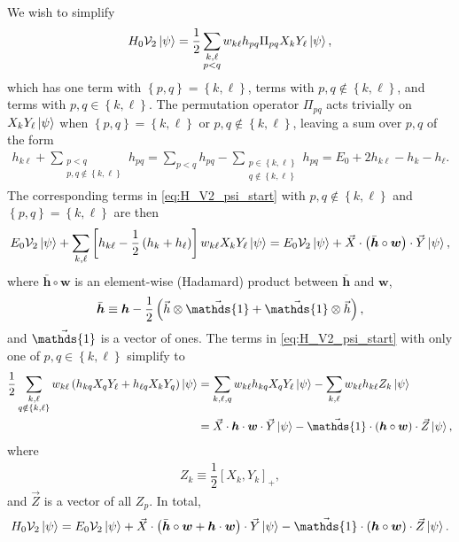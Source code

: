 \documentclass[nofootinbib,notitlepage,11pt]{revtex4-2}
\newcommand{\f}[2]{\dfrac{#1}{#2}} %
\newcommand{\p}[1]{\left(#1\right)} %
\renewcommand{\sp}[1]{\left[#1\right]} %
\renewcommand{\set}[1]{\left\{#1\right\}} %
\renewcommand{\c}{\cdot} %
\renewcommand{\oc}{\circ} %
\newcommand{\m}{\bm} %
\renewcommand{\v}{\vec} %
\newcommand{\1}{\mathds{1}}
\newcommand{\V}{\mathcal{V}}
\begin{document}
We wish to simplify
\begin{align}
  H_0 \V_2 \ket\psi
  = \f12 \sum_{\substack{k,\ell\\p<q}} w_{k\ell} h_{pq}
  \Pi_{pq} X_k Y_\ell \ket\psi,
  \label{eq:H_V2_psi_start}
\end{align}
which has one term with $\set{p,q}=\set{k,\ell}$, terms with
$p,q\notin\set{k,\ell}$, and terms with $p,q\in\set{k,\ell}$.  The
permutation operator $\Pi_{pq}$ acts trivially on
$X_k Y_\ell \ket\psi$ when $\set{p,q}=\set{k,\ell}$ or
$p,q\notin\set{k,\ell}$, leaving a sum over $p,q$ of the form
\begin{align}
  h_{k\ell} + \sum_{\substack{p<q\\p,q\notin\set{k,\ell}}} h_{pq}
  = \sum_{p<q} h_{pq}
  - \sum_{\substack{p\in\set{k,\ell}\\q\notin\set{k,\ell}}} h_{pq}
  = E_0 + 2 h_{k\ell} - h_k - h_\ell.
\end{align}
The corresponding terms in \eqref{eq:H_V2_psi_start} with
$p,q\notin\set{k,\ell}$ and $\set{p,q}=\set{k,\ell}$ are then
\begin{align}
  E_0 \V_2 \ket\psi + \sum_{k,\ell}
  \sp{h_{k\ell} - \f12\p{h_k+h_\ell}} w_{k\ell} X_k Y_\ell \ket\psi
  = E_0 \V_2 \ket\psi + \v X \c \p{\bar{\m h}\oc\m w} \c \v Y \ket\psi,
\end{align}
where $\bar{\m h}\oc\m w$ is an element-wise (Hadamard) product
between $\bar{\m h}$ and $\m w$,
\begin{align}
  \bar{\m h} \equiv \m h - \f12\p{\v h\otimes\v\1 + \v\1\otimes\v h},
\end{align}
and $\v\1$ is a vector of ones.  The terms in
\eqref{eq:H_V2_psi_start} with only one of $p,q\in\set{k,\ell}$
simplify to
\begin{align}
  \f12 \sum_{\substack{k,\ell\\q\notin\set{k,\ell}}} w_{k\ell}
  \p{h_{kq} X_q Y_\ell + h_{\ell q} X_k Y_q} \ket\psi
  &= \sum_{k,\ell,q} w_{k\ell} h_{kq} X_q Y_\ell \ket\psi
  - \sum_{k,\ell} w_{k\ell} h_{k\ell} Z_k \ket\psi \\
  &= \v X \c\m h \c\m w\c\v Y \ket\psi
  - \v\1 \c \p{\m h\oc\m w}\c \v Z \ket\psi,
\end{align}
where
\begin{align}
  Z_k \equiv \f12 \sp{X_k, Y_k}_+,
\end{align}
and $\v Z$ is a vector of all $Z_p$.  In total,
\begin{align}
  H_0 \V_2 \ket\psi
  = E_0 \V_2 \ket\psi
  + \v X \c \p{\bar{\m h}\oc\m w + \m h\c\m w} \c \v Y \ket\psi
  - \v\1 \c \p{\m h\oc\m w}\c \v Z \ket\psi.
\end{align}
\end{document}
